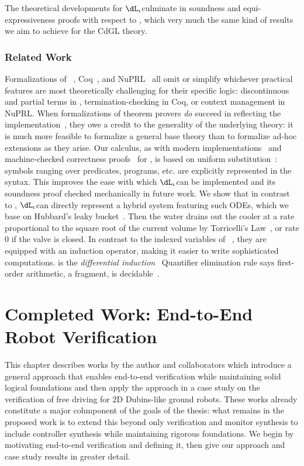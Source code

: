 \documentclass[12pt]{cmuthesis}
\theoremstyle{definition}
\theoremstyle{remark}
\newcommand{\CdGL}{\textsf{CdGL}\xspace}
\newcommand{\dLi}{\ensuremath{\dL_\iota}}
\begin{document}
The theoretical developments for \dLi culminate in soundness and equi-expressiveness proofs with respect to \dL, which very much the same kind of results we aim to achieve for the \CdGL theory.

\subsection{Related Work}
Formalizations of \KeYmaeraX~\cite{DBLP:conf/pldi/BohrerTMMP18}, Coq~\cite{DBLP:journals/jfrea/Barras10}, and NuPRL~\cite{DBLP:conf/itp/AnandR14} all omit or simplify whichever practical features are most theoretically challenging for their specific logic: discontinuous and partial terms in \KeYmaeraX, termination-checking in Coq, or context management in NuPRL.
When formalizations of theorem provers \emph{do} succeed in reflecting the implementation~\cite{DBLP:journals/jar/KumarAMO16}, they owe a credit to the generality of the underlying theory: it is much more feasible to formalize a general base theory than to formalize ad-hoc extensions as they arise.
Our calculus, as with modern implementations~\cite{DBLP:conf/cade/FultonMQVP15} and machine-checked correctness proofs~\cite{DBLP:conf/cpp/BohrerRVVP17} for \dL, is based on uniform substitution~\cite[\S35,\S40]{Church:1956}: symbols ranging over predicates, programs, etc. are explicitly represented in the syntax.
This improves the ease with which \dLi can be implemented and its soundness proof checked mechanically in future work.
We show that in contrast to \dL, \dLi can directly represent a hybrid system featuring such ODEs, which we base on Hubbard's leaky bucket~\cite[\S4.2]{Hubbard}.
Then the water drains out the cooler at a rate proportional to the square root of the current volume  by Torricelli's Law~\cite{driver1998torricelli}, or rate 0 if the valve is closed.
In contrast to the indexed variables of \QdL~\cite{DBLP:journals/lmcs/Platzer12b}, they are equipped with an induction operator, making it easier to write sophisticated computations.
 is the \emph{differential induction}~\cite{DBLP:journals/logcom/Platzer10}
Quantifier elimination rule  says first-order arithmetic, a fragment, is decidable~\cite{tarski1998decision}.

\chapter{Completed Work:  End-to-End Robot Verification}
\label{ch:end-to-end-v}
This chapter describes  works by the author and collaborators which introduce a general approach that enables end-to-end verification while maintaining solid logical foundations and then apply the approach in a case study on the verification of free driving for 2D Dubins-like ground robots.
These works already constitute a major cohmponent of the goals of the thesis: what remains in the proposed work is to extend this beyond only verification and monitor synthesis to include controller synthesis while maintaining rigorous foundations.
We begin by motivating end-to-end verification and defining it, then give our approach and case study results in greater detail.
\end{document}
